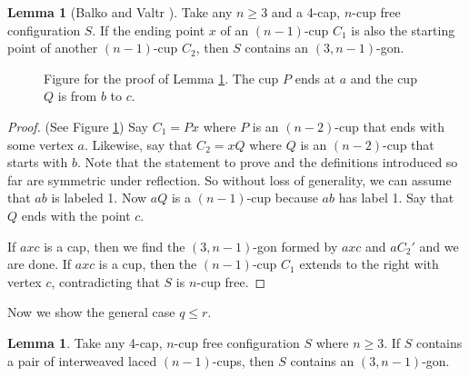 \documentclass{amsart}
\theoremstyle{definition}
\newtheorem{lemma}[thm]{Lemma}
\numberwithin{thm}{section}
\begin{document}
\begin{lemma}[Balko and Valtr \cite{balko2017sat}]
\label{lem:cupcup}
Take any $n \geq 3$ and a 4-cap, $n$-cup free configuration $S$.
If the ending point $x$ of an $(n-1)$-cup $C_1$
is also the starting point of another $(n-1)$-cup $C_2$, then $S$ contains an $(3, n-1)$-gon. 	
\end{lemma}
\begin{center}
\begin{figure}
\caption{Figure for the proof of Lemma \ref{lem:cupcup}. The cup $P$ ends at $a$ and the cup $Q$
is from $b$ to $c$.}
\label{fig:lem-cupcup}
\end{figure}
\end{center}
\begin{proof}
(See Figure \ref{fig:lem-cupcup}) Say $C_1 = Px$ where $P$ is an $(n-2)$-cup that ends with some vertex $a$.
Likewise, say that $C_2 = xQ$ where $Q$ is an $(n-2)$-cup that starts with $b$.
Note that the statement to prove and the definitions introduced so far are symmetric under reflection.
So without loss of generality, we can assume that $ab$ is labeled 1.
Now $aQ$ is a $(n-1)$-cup because $ab$ has label 1.
Say that $Q$ ends with the point $c$.

If $axc$ is a cap, then we find the $(3, n-1)$-gon formed by $axc$ and $aC_2'$ and we are done.
If $axc$ is a cup, then the $(n-1)$-cup $C_1$ extends to the right with vertex $c$, contradicting that $S$ is $n$-cup free.
\end{proof}

Now we show the general case $q \leq r$.
\begin{lemma}
\label{lem:inter-gon}
Take any 4-cap, $n$-cup free configuration $S$ where $n \geq 3$.
If $S$ contains a pair of interweaved laced $(n-1)$-cups, then $S$ contains an $(3, n-1)$-gon.
\end{lemma}
\end{document}
